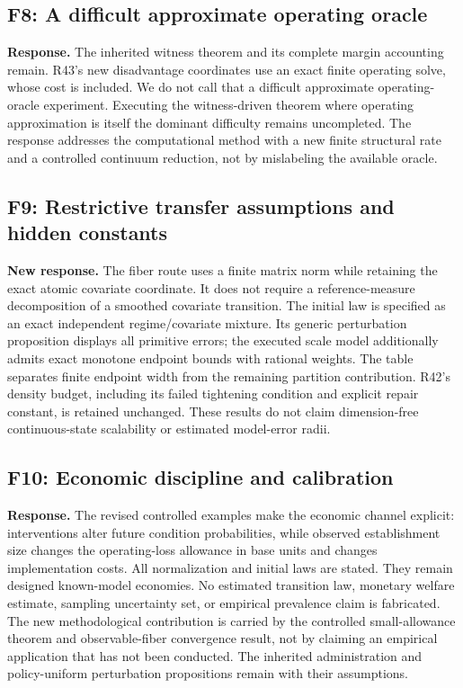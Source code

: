 \subsection*{F8: A difficult approximate operating oracle}
\textbf{Response.} The inherited witness theorem and its complete margin accounting remain. R43's new disadvantage coordinates use an exact finite operating solve, whose cost is included. We do not call that a difficult approximate operating-oracle experiment. Executing the witness-driven theorem where operating approximation is itself the dominant difficulty remains uncompleted. The response addresses the computational method with a new finite structural rate and a controlled continuum reduction, not by mislabeling the available oracle.

\subsection*{F9: Restrictive transfer assumptions and hidden constants}
\textbf{New response.} The fiber route uses a finite matrix norm while retaining the exact atomic covariate coordinate. It does not require a reference-measure decomposition of a smoothed covariate transition. The initial law is specified as an exact independent regime/covariate mixture. Its generic perturbation proposition displays all primitive errors; the executed scale model additionally admits exact monotone endpoint bounds with rational weights. The table separates finite endpoint width from the remaining partition contribution. R42's density budget, including its failed tightening condition and explicit repair constant, is retained unchanged. These results do not claim dimension-free continuous-state scalability or estimated model-error radii.

\subsection*{F10: Economic discipline and calibration}
\textbf{Response.} The revised controlled examples make the economic channel explicit: interventions alter future condition probabilities, while observed establishment size changes the operating-loss allowance in base units and changes implementation costs. All normalization and initial laws are stated. They remain designed known-model economies. No estimated transition law, monetary welfare estimate, sampling uncertainty set, or empirical prevalence claim is fabricated. The new methodological contribution is carried by the controlled small-allowance theorem and observable-fiber convergence result, not by claiming an empirical application that has not been conducted. The inherited administration and policy-uniform perturbation propositions remain with their assumptions.

